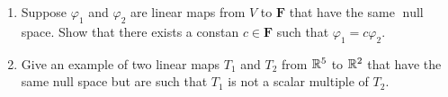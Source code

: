 \documentclass[10pt,a4paper]{report}
\DeclareMathOperator{\NULL}{null}
\newcommand{\F}{\textbf{F}}
\begin{document}
\begin{enumerate}
\item Suppose $\varphi_1$ and $\varphi_2$ are linear maps from $V$ to $\F$ that have the same $\NULL$ space.  Show that there exists a constan $c \in \F$ such that $\varphi_1=c \varphi_2$.

\item Give an example of two linear maps $T_1$ and $T_2$ from $\mathbb{R}^5$ to $\mathbb{R}^2$ that have the same null space but are such that $T_1$ is not a scalar multiple of $T_2$.



\end{enumerate}
\end{document}
